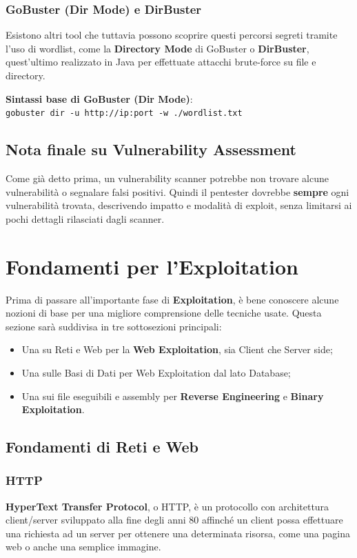 \documentclass{article}
\begin{document}
\subsubsection{GoBuster (Dir Mode) e DirBuster}
Esistono altri tool che tuttavia possono scoprire questi percorsi segreti tramite l'uso di wordlist, come la \textbf{Directory Mode} di GoBuster o \textbf{DirBuster}, quest'ultimo realizzato in Java per effettuate attacchi brute-force su file e directory.

\textbf{Sintassi base di GoBuster (Dir Mode)}:\\
\verb|gobuster dir -u http://ip:port -w ./wordlist.txt|

\subsection{Nota finale su Vulnerability Assessment}
Come già detto prima, un vulnerability scanner potrebbe non trovare alcune vulnerabilità o segnalare falsi positivi. Quindi il pentester dovrebbe \textbf{sempre} ogni vulnerabilità trovata, descrivendo impatto e modalità di exploit, senza limitarsi ai pochi dettagli rilasciati dagli scanner.

\newpage


\section{Fondamenti per l'Exploitation}
Prima di passare all'importante fase di \textbf{Exploitation}, è bene conoscere alcune nozioni di base per una migliore comprensione delle tecniche usate. Questa sezione sarà suddivisa in tre sottosezioni principali:
\begin{itemize}
    \item Una su Reti e Web per la \textbf{Web Exploitation}, sia Client che Server side;
    \item Una sulle Basi di Dati per Web Exploitation dal lato Database;
    \item Una sui file eseguibili e assembly per \textbf{Reverse Engineering} e \textbf{Binary Exploitation}.
\end{itemize}

\subsection{Fondamenti di Reti e Web}
\subsubsection{HTTP}
\textbf{HyperText Transfer Protocol}, o HTTP, è un protocollo con architettura client/server sviluppato alla fine degli anni 80 affinché un client possa effettuare una richiesta ad un server per ottenere una determinata risorsa, come una pagina web o anche una semplice immagine.
\end{document}
